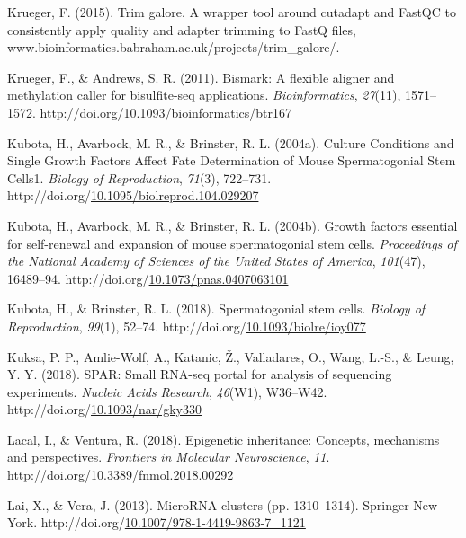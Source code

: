\documentclass[12pt,twoside]{reedthesis}
\newlength{\cslhangindent}
\newenvironment{CSLReferences}[2] %
 {%
  \setlength{\parindent}{0pt}
  \ifodd #1 \everypar{\setlength{\hangindent}{\cslhangindent}}\ignorespaces\fi
  \ifnum #2 > 0
  \setlength{\parskip}{#2\baselineskip}
  \fi
 }%
 {}
\begin{document}
\begin{CSLReferences}{1}{0}
\leavevmode{}%
Krueger, F. (2015). Trim galore. A wrapper tool around cutadapt and FastQC to consistently apply quality and adapter trimming to FastQ files, www.bioinformatics.babraham.ac.uk/projects/trim{\_}galore/.

\leavevmode{}%
Krueger, F., \& Andrews, S. R. (2011). Bismark: A flexible aligner and methylation caller for bisulfite-seq applications. \emph{Bioinformatics}, \emph{27}(11), 1571--1572. http://doi.org/\href{https://doi.org/10.1093/bioinformatics/btr167}{10.1093/bioinformatics/btr167}

\leavevmode{}%
Kubota, H., Avarbock, M. R., \& Brinster, R. L. (2004a). Culture Conditions and Single Growth Factors Affect Fate Determination of Mouse Spermatogonial Stem Cells1. \emph{Biology of Reproduction}, \emph{71}(3), 722--731. http://doi.org/\href{https://doi.org/10.1095/biolreprod.104.029207}{10.1095/biolreprod.104.029207}

\leavevmode{}%
Kubota, H., Avarbock, M. R., \& Brinster, R. L. (2004b). Growth factors essential for self-renewal and expansion of mouse spermatogonial stem cells. \emph{Proceedings of the National Academy of Sciences of the United States of America}, \emph{101}(47), 16489--94. http://doi.org/\href{https://doi.org/10.1073/pnas.0407063101}{10.1073/pnas.0407063101}

\leavevmode{}%
Kubota, H., \& Brinster, R. L. (2018). Spermatogonial stem cells{\textdagger}. \emph{Biology of Reproduction}, \emph{99}(1), 52--74. http://doi.org/\href{https://doi.org/10.1093/biolre/ioy077}{10.1093/biolre/ioy077}

\leavevmode{}%
Kuksa, P. P., Amlie-Wolf, A., Katanic, Ž., Valladares, O., Wang, L.-S., \& Leung, Y. Y. (2018). SPAR: Small RNA-seq portal for analysis of sequencing experiments. \emph{Nucleic Acids Research}, \emph{46}(W1), W36--W42. http://doi.org/\href{https://doi.org/10.1093/nar/gky330}{10.1093/nar/gky330}

\leavevmode{}%
Lacal, I., \& Ventura, R. (2018). Epigenetic inheritance: Concepts, mechanisms and perspectives. \emph{Frontiers in Molecular Neuroscience}, \emph{11}. http://doi.org/\href{https://doi.org/10.3389/fnmol.2018.00292}{10.3389/fnmol.2018.00292}

\leavevmode{}%
Lai, X., \& Vera, J. (2013). MicroRNA clusters (pp. 1310--1314). Springer New York. http://doi.org/\href{https://doi.org/10.1007/978-1-4419-9863-7_1121}{10.1007/978-1-4419-9863-7\_1121}


\end{CSLReferences}
\end{document}
